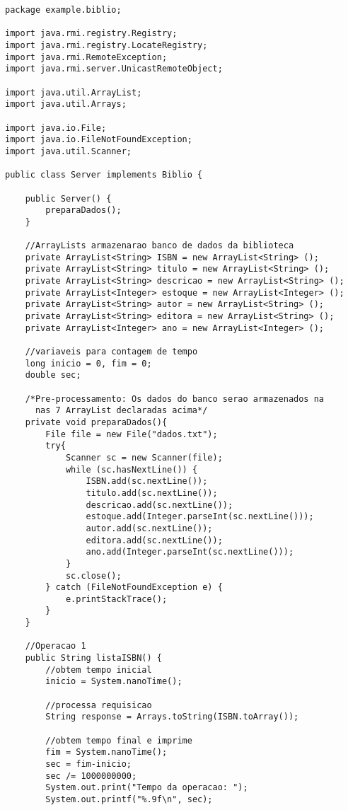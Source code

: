 \documentclass[11pt, brazil]{article} %
\begin{document}
\begin{verbatim}
package example.biblio;
	
import java.rmi.registry.Registry;
import java.rmi.registry.LocateRegistry;
import java.rmi.RemoteException;
import java.rmi.server.UnicastRemoteObject;

import java.util.ArrayList;
import java.util.Arrays;

import java.io.File;
import java.io.FileNotFoundException;
import java.util.Scanner;
	
public class Server implements Biblio {
	
    public Server() {
    	preparaDados();	
    }
    
    //ArrayLists armazenarao banco de dados da biblioteca
    private ArrayList<String> ISBN = new ArrayList<String> ();
    private ArrayList<String> titulo = new ArrayList<String> ();
    private ArrayList<String> descricao = new ArrayList<String> ();
    private ArrayList<Integer> estoque = new ArrayList<Integer> ();
    private ArrayList<String> autor = new ArrayList<String> ();
    private ArrayList<String> editora = new ArrayList<String> ();
    private ArrayList<Integer> ano = new ArrayList<Integer> ();
    
    //variaveis para contagem de tempo
    long inicio = 0, fim = 0;
    double sec;
    
    /*Pre-processamento: Os dados do banco serao armazenados na
      nas 7 ArrayList declaradas acima*/
    private void preparaDados(){
        File file = new File("dados.txt");
        try{
            Scanner sc = new Scanner(file);
            while (sc.hasNextLine()) {
                ISBN.add(sc.nextLine());
                titulo.add(sc.nextLine());
                descricao.add(sc.nextLine());
                estoque.add(Integer.parseInt(sc.nextLine()));
                autor.add(sc.nextLine());
                editora.add(sc.nextLine());            
                ano.add(Integer.parseInt(sc.nextLine()));                
            }
            sc.close();
        } catch (FileNotFoundException e) {
            e.printStackTrace();
        }
    }
	
    //Operacao 1
    public String listaISBN() {
    	//obtem tempo inicial
    	inicio = System.nanoTime();
    	
    	//processa requisicao
    	String response = Arrays.toString(ISBN.toArray());
    	
    	//obtem tempo final e imprime
    	fim = System.nanoTime();
        sec = fim-inicio;
        sec /= 1000000000;
        System.out.print("Tempo da operacao: ");
        System.out.printf("%.9f\n", sec);


\end{verbatim}
\end{document}
